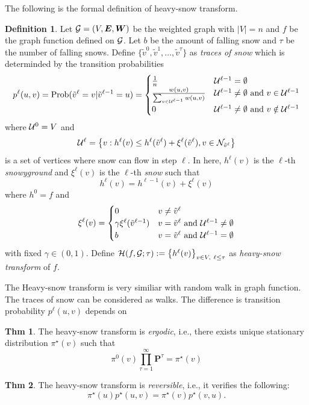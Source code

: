 \documentclass[preprint, review, 12pt]{article}
\theoremstyle{definition}
\newtheorem{dfn}{Definition}
\newtheorem{thm}{Thm}[section]
\theoremstyle{remark}
\begin{document}
The following is the formal definition of heavy-snow transform.
\begin{dfn}\label{snow:df_hst}
Let ${\cal G}=(V,{\boldsymbol E},{\boldsymbol W})$ be the weighted graph with $|V|=n$ and $f$ be the graph function defined on ${\cal G}$. Let $b$ be the amount of falling snow and $\tau$ be the number of falling snows. Define $\{\tilde v^0,\tilde v^1,\dots ,\tilde v^{\tau}\}$ as \emph{traces of snow} which is determinded by the transition probabilities 
\[
p^{\ell}(u,v)=
\mbox{Prob}(\tilde v^{\ell}=v|\tilde v^{\ell-1}=u)
=\begin{cases}
\frac{1}{n}  & {\cal U}^{\ell-1}= \emptyset \\ 
\frac{w(u,v)}{\sum_{v\in {\cal U}^{\ell-1}} w(u,v)} & {\cal U}^{\ell-1}\neq \emptyset 
\mbox{ and } v \in {\cal U}^{\ell-1}\\ 
0 & {\cal U}^{\ell-1}\neq \emptyset \mbox{ and } v \notin {\cal U}^{\ell-1}
\end{cases}
\]
where ${\cal U}^0=V$ and 
\[
{\cal U}^{\ell}=\big\{v: h^{\ell}(v)\leq h^{\ell}(\tilde v^{\ell})+\xi^{\ell}(\tilde v^{\ell}), v\in {\cal N}_{\tilde v^{\ell}}\big\}
\]
is a set of vertices where snow can flow in step $\ell$. In here, $h^{\ell}(v)$ is the $\ell$-th \emph{snowyground} and $\xi^{\ell}(v)$ is the $\ell$-th \emph{snow} such that 
\[
h^{\ell}(v)=h^{\ell-1}(v)+\xi^{\ell}(v)
\]
where $h^{0}=f$ and 
\[
\xi^{\ell}(v)=	\begin{cases}
0 & v \neq  \tilde v^{\ell} \\
\gamma \xi^{\ell}(\tilde v^{\ell-1})  & v =  \tilde v^{\ell} \mbox{ and } {\cal U}^{\ell-1}\neq \emptyset \\
b &  v = \tilde v^{\ell} \mbox{ and } {\cal U}^{\ell-1} = \emptyset
\end{cases}
\]
with fixed $\gamma\in(0,1)$. 
Define ${\cal H}(f,{\cal G};\tau):=\big\{h^{\ell}(v)\big\}_{v \in V,~\ell \leq\tau }$ as \emph{heavy-snow transform} of $f$. 
\end{dfn}
The Heavy-snow transform is very similiar with random walk in graph function. The traces of snow can be considered as walks. The difference is transition probability $p^{\ell}(u,v)$ depends on 
\begin{thm}
The heavy-snow transform is \emph{ergodic}, i.e., there exists unique stationary distribution $\pi^{\star}(v)$ such that 
\[
\pi^{0}(v)\prod_{\tau=1}^{\infty}{\boldsymbol P}^{\tau}=\pi^{\star}(v)
\]
\end{thm}
\begin{thm}
The heavy-snow transform is \emph{reversible}, i.e., it verifies the following:
\[
\pi^{\star}(u)p^{\star}(u,v)=\pi^{\star}(v)p^{\star}(v,u).
\]
\end{thm}
\end{document}
